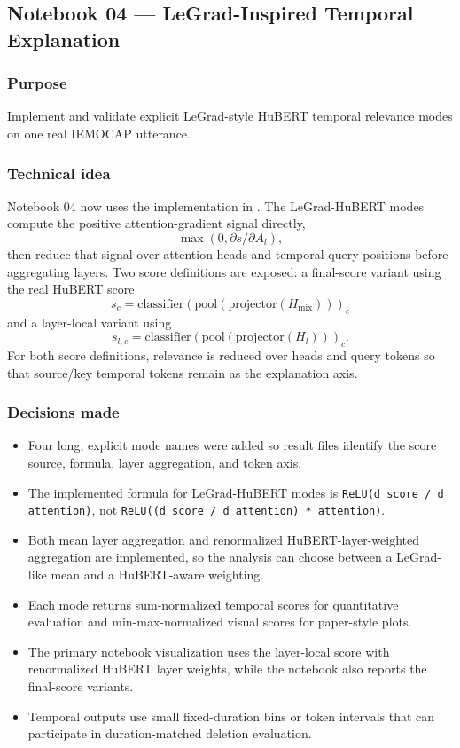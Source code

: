 \documentclass[11pt]{article}
\begin{document}
\subsection{Notebook 04 --- LeGrad-Inspired Temporal Explanation}

\subsubsection*{Purpose}
Implement and validate explicit LeGrad-style HuBERT temporal relevance modes
on one real IEMOCAP utterance.

\subsubsection*{Technical idea}
Notebook 04 now uses the implementation in
. The LeGrad-HuBERT
modes compute the positive attention-gradient signal directly,
\[
\max(0, \partial s / \partial A_l),
\]
then reduce that signal over attention heads and temporal query positions before
aggregating layers. Two score definitions are exposed: a final-score variant using the real HuBERT score
\[
s_c = \mathrm{classifier}(\mathrm{pool}(\mathrm{projector}(H_{\mathrm{mix}})))_c
\]
and a layer-local variant using
\[
s_{l,c} = \mathrm{classifier}(\mathrm{pool}(\mathrm{projector}(H_l)))_c.
\]
For both score definitions, relevance is reduced over heads and query tokens so
that source/key temporal tokens remain as the explanation axis.

\subsubsection*{Decisions made}
\begin{itemize}
  \item Four long, explicit mode names were added so result files identify the
  score source, formula, layer aggregation, and token axis.
  \item The implemented formula for LeGrad-HuBERT modes is
  \texttt{ReLU(d score / d attention)}, not
  \texttt{ReLU((d score / d attention) * attention)}.
  \item Both mean layer aggregation and renormalized HuBERT-layer-weighted
  aggregation are implemented, so the analysis can choose between a
  LeGrad-like mean and a HuBERT-aware weighting.
  \item Each mode returns sum-normalized temporal scores for quantitative
  evaluation and min-max-normalized visual scores for paper-style plots.
  \item The primary notebook visualization uses the layer-local score with
  renormalized HuBERT layer weights, while the notebook also reports the
  final-score variants.
  \item Temporal outputs use small fixed-duration bins or token intervals that can participate in duration-matched deletion evaluation.
\end{itemize}
\end{document}
